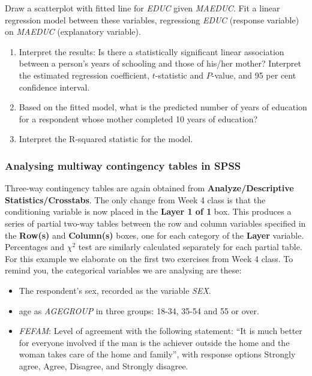\documentclass[11pt,a4paper,openany]{book}
\begin{document}
Draw a scatterplot with fitted line for \emph{EDUC} given \emph{MAEDUC}.
Fit a linear regression model between these variables, regressiong
\emph{EDUC} (response variable) on \emph{MAEDUC} (explanatory variable).

\begin{enumerate}
\def\labelenumi{\arabic{enumi}.}
\item
  Interpret the results: Is there a statistically significant linear
  association between a person's years of schooling and those of his/her
  mother? Interpret the estimated regression coefficient,
  \(t\)-statistic and \(P\)-value, and 95 per cent confidence interval.
\item
  Based on the fitted model, what is the predicted number of years of
  education for a respondent whose mother completed 10 years of
  education?
\item
  Interpret the R-squared statistic for the model.
\end{enumerate}

\subsubsection*{Analysing multiway contingency tables in
SPSS}\label{analysing-multiway-contingency-tables-in-spss}

Three-way contingency tables are again obtained from
\textbf{Analyze/Descriptive Statistics/Crosstabs}. The only change from
Week 4 class is that the conditioning variable is now placed in the
\textbf{Layer 1 of 1} box. This produces a series of partial two-way
tables between the row and column variables specified in the
\textbf{Row(s)} and \textbf{Column(s)} boxes, one for each category of
the \textbf{Layer} variable. Percentages and \(\chi^{2}\) test are
similarly calculated separately for each partial table. For this example
we elaborate on the first two exercises from Week 4 class. To remind
you, the categorical variables we are analysing are these:

\begin{itemize}
\item
  The respondent's sex, recorded as the variable \emph{SEX}.
\item
  age as \emph{AGEGROUP} in three groups: 18-34, 35-54 and 55 or over.
\item
  \emph{FEFAM}: Level of agreement with the following statement: ``It is
  much better for everyone involved if the man is the achiever outside
  the home and the woman takes care of the home and family'', with
  response options Strongly agree, Agree, Disagree, and Strongly
  disagree.
\end{itemize}
\end{document}
